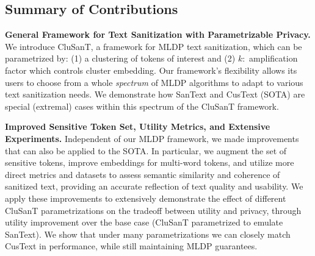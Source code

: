 \documentclass[11pt]{article}
\newcommand{\clusant}{CluSanT\xspace}
\begin{document}

\subsection{Summary of Contributions}

\noindent
\textbf{General Framework for Text Sanitization with Parametrizable Privacy. }  
    We introduce \clusant, a framework for MLDP text sanitization, which can be parametrized by: (1) a clustering of tokens of interest and (2) $k:$ amplification factor which controls cluster embedding. 
    Our framework's flexibility allows its users to choose from a whole {\em spectrum} of MLDP algorithms to adapt to various text sanitization needs. 
    We demonstrate how SanText and CusText (SOTA) are special (extremal) cases within this spectrum of the \clusant framework.

\vspace{0.5em}
\noindent
\textbf{Improved Sensitive Token Set, Utility Metrics, and Extensive Experiments.} 
Independent of our MLDP framework, we made improvements that can also be applied to the SOTA. In particular, we augment the set of sensitive tokens, improve embeddings for multi-word tokens, and utilize more direct metrics and datasets to assess semantic similarity and coherence of sanitized text, providing an accurate reflection of text quality and usability. 
We apply these improvements to extensively demonstrate the effect of different \clusant parametrizations on the tradeoff between  utility and privacy, through utility improvement over the base case (\clusant parametrized to emulate SanText). We show that under many parametrizations  we can closely match CusText in performance, while still maintaining MLDP guarantees.
    
\end{document}
